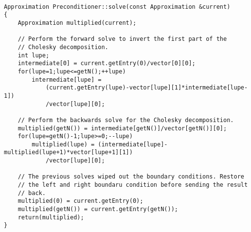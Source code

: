 \begin{lstlisting}[caption={An example of the solve method that must be
    defined for the {\tt Preconditioner} class.},
                   basicstyle=\scriptsize,
                   label=listing:preconditionerMethods]

Approximation Preconditioner::solve(const Approximation &current)
{
	Approximation multiplied(current);

	// Perform the forward solve to invert the first part of the
	// Cholesky decomposition.
	int lupe;
	intermediate[0] = current.getEntry(0)/vector[0][0];
	for(lupe=1;lupe<=getN();++lupe)
		intermediate[lupe] = 
			(current.getEntry(lupe)-vector[lupe][1]*intermediate[lupe-1])
			/vector[lupe][0];

	// Perform the backwards solve for the Cholesky decomposition.
	multiplied(getN()) = intermediate[getN()]/vector[getN()][0];
	for(lupe=getN()-1;lupe>=0;--lupe)
		multiplied(lupe) = (intermediate[lupe]-multiplied(lupe+1)*vector[lupe+1][1])
			/vector[lupe][0];

	// The previous solves wiped out the boundary conditions. Restore
	// the left and right boundaru condition before sending the result
	// back.
	multiplied(0) = current.getEntry(0);
	multiplied(getN()) = current.getEntry(getN());
	return(multiplied);
}


\end{lstlisting}



